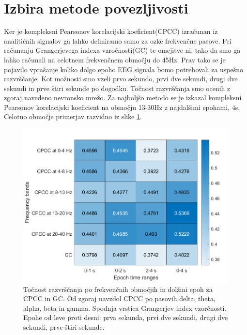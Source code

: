 \section{Izbira metode povezljivosti}
Ker je kompleksni Pearsonov korelacijski koeficient(CPCC) izračunan iz analitičnih signalov ga lahko definiramo samo za ozke frekvenčne pasove. Pri računanju Grangerjevega indexa vzročnosti(GC) te omejitve ni, tako da smo ga lahko računali na celotnem frekvenčnem območju do 45Hz. Prav tako se je pojavilo vprašanje koliko dolgo epoho EEG signala bomo potrebovali za uspešno razvrščanje. Kot možnosti smo vzeli prvo sekundo, prvi dve sekundi, drugi dve sekundi in prve štiri sekunde po dogodku. Točnost razvrščanja smo ocenili z zgoraj navedeno nevronsko mrežo. Za najboljšo metodo se je izkazal kompleksni Pearsonov korelacijski koeficient na območju 13-30Hz z najdalšimi epohami, 4s. Celotno območje primerjav razvidno iz slike \ref{slika:primerjava_obmocij}.
\begin{figure}
    \begin{center}
    \includegraphics[width=1\linewidth]{slike/Comparison.png}
    \end{center}
    \caption{Točnost razvrščanja po frekvenčnih območjih in dolžini epoh za CPCC in GC. Od zgoraj navzdol CPCC po pasovih delta, theta, alpha, beta in gamma. Spodnja vrstica Grangerjev index vzorčnosti. Epohe od leve proti desni: prva sekunda, prvi dve sekundi, drugi dve sekundi, prve štiri sekunde.}
    \label{slika:primerjava_obmocij}
\end{figure}

\newpage
